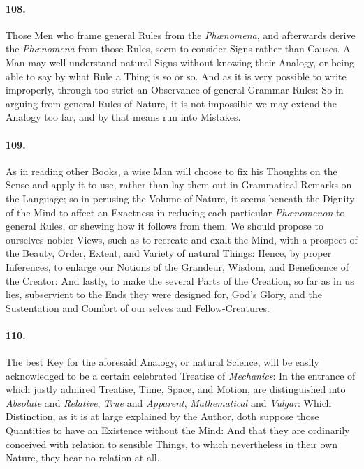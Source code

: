 \documentclass[]{article}
\newenvironment{sectionbody}{\begin{multicols}{2}}{\end{multicols}}
\begin{document}
\begin{sectionbody}
\paragraph{108.} Those Men who frame general Rules from the
\emph{Ph{\ae}nomena}, and afterwards derive the
\emph{Ph{\ae}nomena} from those Rules, seem to consider Signs
rather than Causes.  A Man may well understand natural Signs
without knowing their Analogy, or being able to say by what Rule
a Thing is so or so.  And as it is very possible to write
improperly, through too strict an Observance of general
Grammar-Rules: So in arguing from general Rules of Nature, it is
not impossible we may extend the Analogy too far, and by that
means run into Mistakes.



\paragraph{109.} As in reading other Books, a wise Man will choose to fix his
Thoughts on the Sense and apply it to use, rather than lay them
out in Grammatical Remarks on the Language; so in perusing the
Volume of Nature, it seems beneath the Dignity of the Mind to
affect an Exactness in reducing each particular
\emph{Ph{\ae}nomenon} to general Rules, or shewing how it
follows from them.  We should propose to ourselves nobler Views,
such as to recreate and exalt the Mind, with a prospect of the
Beauty, Order, Extent, and Variety of natural Things: Hence, by
proper Inferences, to enlarge our Notions of the Grandeur,
Wisdom, and Beneficence of the {\sc Creator}: And lastly, to make the
several Parts of the Creation, so far as in us lies, subservient
to the Ends they were designed for, {\sc God}'s Glory, and the
Sustentation and Comfort of our selves and Fellow-Creatures.



\paragraph{110.} The best Key for the aforesaid Analogy, or natural Science, will
be easily acknowledged to be a certain celebrated Treatise of
\emph{Mechanics}: In the entrance of which justly admired
Treatise, Time, Space, and Motion, are distinguished into
\emph{Absolute} and \emph{Relative}, \emph{True} and
\emph{Apparent}, \emph{Mathematical} and \emph{Vulgar}:
Which Distinction, as it is at large explained by the Author,
doth suppose those Quantities to have an Existence without the
Mind: And that they are ordinarily conceived with relation to
sensible Things, to which nevertheless in their own Nature, they
bear no relation at all.




\end{sectionbody}
\end{document}
